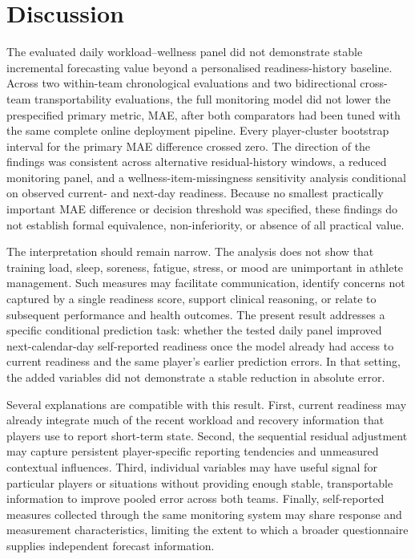 \section{Discussion}
The evaluated daily workload--wellness panel did not demonstrate stable incremental forecasting value beyond a personalised readiness-history baseline. Across two within-team chronological evaluations and two bidirectional cross-team transportability evaluations, the full monitoring model did not lower the prespecified primary metric, MAE, after both comparators had been tuned with the same complete online deployment pipeline. Every player-cluster bootstrap interval for the primary MAE difference crossed zero. The direction of the findings was consistent across alternative residual-history windows, a reduced monitoring panel, and a wellness-item-missingness sensitivity analysis conditional on observed current- and next-day readiness. Because no smallest practically important MAE difference or decision threshold was specified, these findings do not establish formal equivalence, non-inferiority, or absence of all practical value.

The interpretation should remain narrow. The analysis does not show that training load, sleep, soreness, fatigue, stress, or mood are unimportant in athlete management. Such measures may facilitate communication, identify concerns not captured by a single readiness score, support clinical reasoning, or relate to subsequent performance and health outcomes. The present result addresses a specific conditional prediction task: whether the tested daily panel improved next-calendar-day self-reported readiness once the model already had access to current readiness and the same player's earlier prediction errors. In that setting, the added variables did not demonstrate a stable reduction in absolute error.

Several explanations are compatible with this result. First, current readiness may already integrate much of the recent workload and recovery information that players use to report short-term state. Second, the sequential residual adjustment may capture persistent player-specific reporting tendencies and unmeasured contextual influences. Third, individual variables may have useful signal for particular players or situations without providing enough stable, transportable information to improve pooled error across both teams. Finally, self-reported measures collected through the same monitoring system may share response and measurement characteristics, limiting the extent to which a broader questionnaire supplies independent forecast information.

